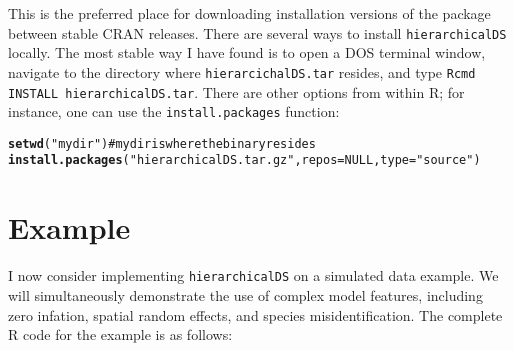 \documentclass{article}\usepackage{graphicx, color}
\makeatletter
\newcommand{\hlfunctioncall}[1]{\textcolor[rgb]{0.501960784313725,0,0.329411764705882}{\textbf{#1}}}%
\newcommand{\hlstring}[1]{\textcolor[rgb]{0.6,0.6,1}{#1}}%
\newenvironment{kframe}{%
 \def\at@end@of@kframe{}%
 \ifinner\ifhmode%
  \def\at@end@of@kframe{\end{minipage}}%
  \begin{minipage}{\columnwidth}%
 \fi\fi%
 \def\FrameCommand##1{\hskip\@totalleftmargin \hskip-\fboxsep
 \colorbox{shadecolor}{##1}\hskip-\fboxsep
     \hskip-\linewidth \hskip-\@totalleftmargin \hskip\columnwidth}%
 \MakeFramed {\advance\hsize-\width
   \@totalleftmargin\z@ \linewidth\hsize
   \@setminipage}}%
 {\par\unskip\endMakeFramed%
 \at@end@of@kframe}
\newenvironment{knitrout}{}{} %
\makeatother
\begin{document}
\vspace{.2in}
This is the preferred place for downloading installation versions of the package between stable CRAN releases.  There are several ways to install \texttt{hierarchicalDS} locally.  The most stable way
I have found is to open a DOS terminal window, navigate to the directory where \texttt{hierarcichalDS.tar} resides, and type \texttt{Rcmd INSTALL hierarchicalDS.tar}.  There are other options from within R; for instance, one can use the \texttt{install.packages} function:

\begin{knitrout}
\color{fgcolor}\begin{kframe}
\begin{alltt}
\hlfunctioncall{setwd}(\hlstring{"mydir"})  #mydir is where the binary resides
\hlfunctioncall{install.packages}(\hlstring{"hierarchicalDS.tar.gz"}, repos = NULL, type = \hlstring{"source"})
\end{alltt}
\end{kframe}
\end{knitrout}



\section{Example}

I now consider implementing \texttt{hierarchicalDS} on a simulated data example.  We will simultaneously
demonstrate the use of complex model features, including zero infation, spatial random effects, and 
species misidentification.  The complete R code for the example is as follows:
\end{document}
